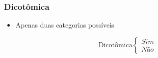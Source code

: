 \documentclass{article}
\begin{document}
\vspace{0.1cm}
\subsubsection{Dicotômica}

\begin{itemize}
    \item Apenas duas categorias possíveis
\end{itemize}

\[
\text{Dicotômica} \left\{
    \begin{array}{l}
        Sim \\
        Não
    \end{array}
\right.
\]
\end{document}

